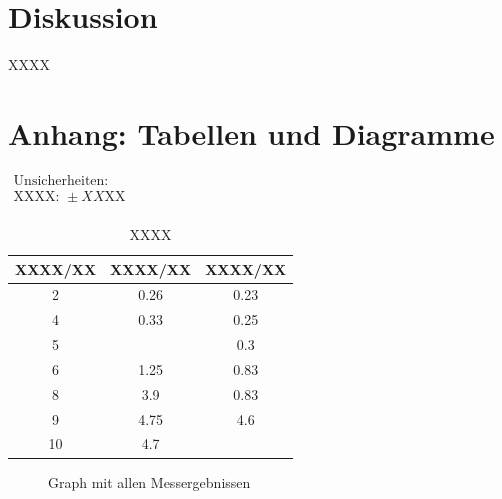 \documentclass[11pt,a4paper]{article}
\begin{document}
\section{Diskussion}

XXXX

\pagebreak

\section{Anhang: Tabellen und Diagramme}

\begin{table}[h]
\centering
\caption{XXXX} \vspace{11pt}
$\begin{array}{l}
\textrm{Unsicherheiten:}\\
\textrm{XXXX: } \pm XX \textrm{XX}\\
\end{array}$
\begin{tabular}{ccc}
\toprule
\textrm{XXXX}/\textrm{XX} & \textrm{XXXX}/\textrm{XX} & \textrm{XXXX}/\textrm{XX} \\
\midrule 
2 & 0.26 & 0.23\\
\hline
4 & 0.33 & 0.25\\
\hline 
5 & & 0.3\\
\hline 
6 & 1.25 & 0.83\\
\hline 
8 & 3.9 & 0.83\\ 
\hline
9 & 4.75 & 4.6\\ 
\hline
10 & 4.7 &\\ 
\bottomrule
\end{tabular}
\label{Tab:X}
\end{table}

\begin{figure}[p]
\centering
{}
\renewcommand\thefigure{1}
\caption[Graph mit allen Messergebnissen]{Graph mit allen Messergebnissen}
\label{Abb:1}
\end{figure}
\end{document}
